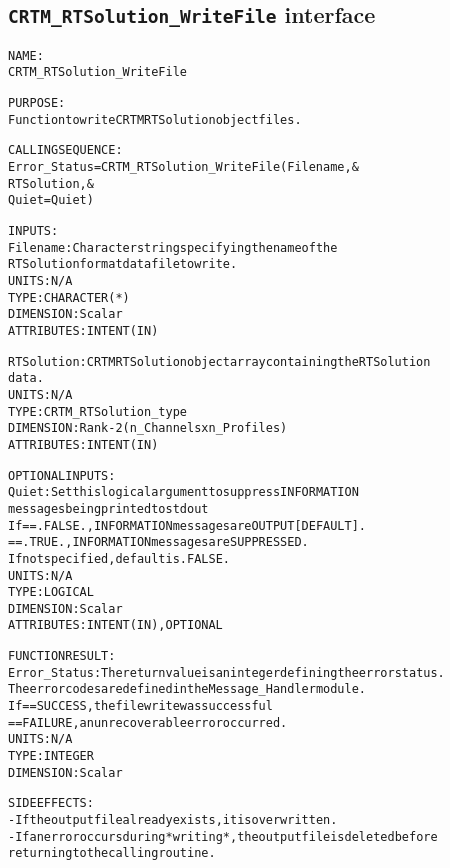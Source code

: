 \subsection{\texttt{CRTM\_RTSolution\_WriteFile} interface}
  \label{sec:CRTM_RTSolution_WriteFile_interface}
  \begin{alltt}
 
  NAME:
        CRTM_RTSolution_WriteFile
 
  PURPOSE:
        Function to write CRTM RTSolution object files.
 
  CALLING SEQUENCE:
        Error_Status = CRTM_RTSolution_WriteFile( Filename     , &
                                                  RTSolution   , &
                                                  Quiet = Quiet  )
 
  INPUTS:
        Filename:     Character string specifying the name of the
                      RTSolution format data file to write.
                      UNITS:      N/A
                      TYPE:       CHARACTER(*)
                      DIMENSION:  Scalar
                      ATTRIBUTES: INTENT(IN)
 
        RTSolution:   CRTM RTSolution object array containing the RTSolution
                      data.
                      UNITS:      N/A
                      TYPE:       CRTM_RTSolution_type
                      DIMENSION:  Rank-2 (n_Channels x n_Profiles)
                      ATTRIBUTES: INTENT(IN)
 
  OPTIONAL INPUTS:
        Quiet:        Set this logical argument to suppress INFORMATION
                      messages being printed to stdout
                      If == .FALSE., INFORMATION messages are OUTPUT [DEFAULT].
                         == .TRUE.,  INFORMATION messages are SUPPRESSED.
                      If not specified, default is .FALSE.
                      UNITS:      N/A
                      TYPE:       LOGICAL
                      DIMENSION:  Scalar
                      ATTRIBUTES: INTENT(IN), OPTIONAL
 
  FUNCTION RESULT:
        Error_Status: The return value is an integer defining the error status.
                      The error codes are defined in the Message_Handler module.
                      If == SUCCESS, the file write was successful
                         == FAILURE, an unrecoverable error occurred.
                      UNITS:      N/A
                      TYPE:       INTEGER
                      DIMENSION:  Scalar
 
  SIDE EFFECTS:
        - If the output file already exists, it is overwritten.
        - If an error occurs during *writing*, the output file is deleted before
          returning to the calling routine.
 
  \end{alltt}
